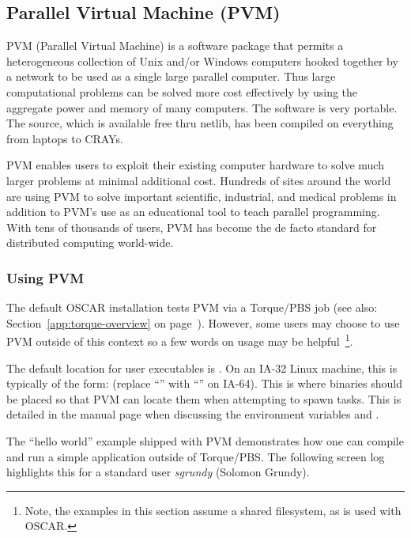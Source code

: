 %
%
%

\subsection{Parallel Virtual Machine (PVM)}
\label{app:pvm-overview}

PVM (Parallel Virtual Machine) is a software package that permits a
heterogeneous collection of Unix and/or Windows computers hooked
together by a network to be used as a single large parallel computer.
Thus large computational problems can be solved more cost effectively
by using the aggregate power and memory of many computers. The
software is very portable. The source, which is available free thru
netlib, has been compiled on everything from laptops to CRAYs.

PVM enables users to exploit their existing computer hardware to solve
much larger problems at minimal additional cost. Hundreds of sites
around the world are using PVM to solve important scientific,
industrial, and medical problems in addition to PVM's use as an
educational tool to teach parallel programming. With tens of thousands
of users, PVM has become the de facto standard for distributed
computing world-wide.

\subsubsection{Using PVM}
\label{app:pvm-usage}

The default OSCAR installation tests PVM via a Torque/PBS job (see also:
Section~\ref{app:torque-overview} on page~\pageref{app:torque-overview}).
However, some users may choose to use PVM outside of this context so a
few words on usage may be helpful~\footnote{Note, the examples in this
  section assume a shared filesystem, as is used with OSCAR.}.

The default location for user executables is
.  On an IA-32 Linux machine, this
is typically of the form:  (replace
``'' with ``'' on IA-64).  This is where
binaries should be placed so that PVM can locate them when attempting
to spawn tasks.  This is detailed in the 
manual page when discussing the environment variables 
and .

The ``hello world'' example shipped with PVM demonstrates how one can
compile and run a simple application outside of Torque/PBS.  The following
screen log highlights this for a standard user \emph{sgrundy} (Solomon
Grundy).

